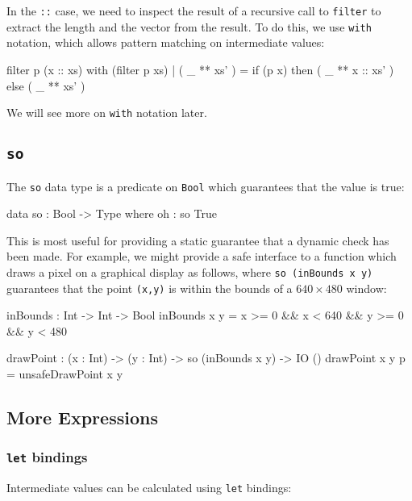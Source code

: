 \noindent
In the \texttt{::} case, we need to inspect the result of a recursive call to \texttt{filter} to extract the length and the vector from the result.
To do this, we use \texttt{with} notation, which allows pattern matching on intermediate values:

\begin{code}
filter p (x :: xs) with (filter p xs)
  | ( _ ** xs' ) = if (p x) then ( _ ** x :: xs' ) else ( _ ** xs' )
\end{code}

\noindent
We will see more on \texttt{with} notation later.

\subsection{\texttt{so}}

The \texttt{so} data type is a predicate on \texttt{Bool} which guarantees that the value is true:

\begin{code}
data so : Bool -> Type where
    oh : so True
\end{code}
 
\noindent
This is most useful for providing a static guarantee that a dynamic check has been made.
For example, we might provide a safe interface to a function which draws a pixel on a graphical display as follows, where \texttt{so (inBounds x y)} guarantees that  the point \texttt{(x,y)} is within the bounds of a $640\times480$ window:

\begin{code}
inBounds : Int -> Int -> Bool
inBounds x y = x >= 0 && x < 640 && y >= 0 && y < 480

drawPoint : (x : Int) -> (y : Int) -> so (inBounds x y) -> IO ()
drawPoint x y p = unsafeDrawPoint x y
\end{code}
 

\subsection{More Expressions}

\subsubsection*{\texttt{let} bindings}

Intermediate values can be calculated using \texttt{let} bindings:

 

